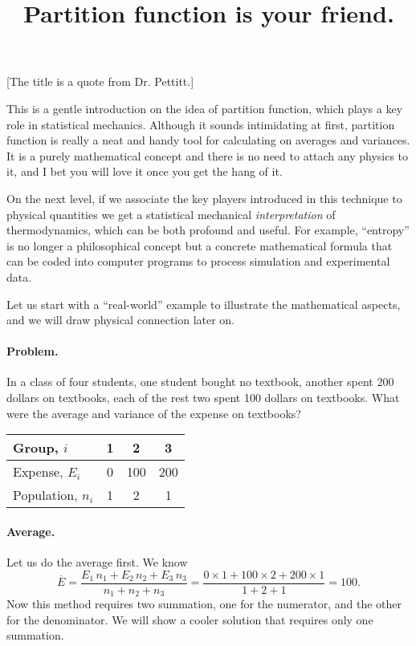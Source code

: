 \documentclass{article}
\begin{document}
\title{Partition function is your friend.}

\author{\vspace{-10ex}}
\date{\vspace{-10ex}}
\maketitle

[The title is a quote from Dr. Pettitt.]

This is a gentle introduction on the idea of partition function,
which plays a key role in statistical mechanics.
%
Although it sounds intimidating at first,
partition function is really a neat and handy tool for
calculating on averages and variances.
%
It is a purely mathematical concept and there is no need to attach
any physics to it,
and I bet you will love it once you get the hang of it.

On the next level, if we associate
the key players introduced in this technique
to physical quantities
we get a statistical mechanical \emph{interpretation}
of thermodynamics, which can be both profound and useful.
%
For example, ``entropy'' is no longer a philosophical concept
but a concrete mathematical formula that can be coded into computer programs
to process simulation and experimental data.

Let us start with a ``real-world'' example
to illustrate the mathematical aspects,
and we will draw physical connection later on.

\paragraph{Problem.}

In a class of four students,
one student bought no textbook,
another spent 200 dollars on textbooks,
each of the rest two spent 100 dollars on textbooks.
What were the average and variance of the expense on textbooks?

\begin{table}[h]
\centering
  \begin{tabular}{l | ccc}
    \hline
    Group, $i$ & 1 & 2 & 3 \\
    \hline
    Expense, $E_i$ & 0 & 100 & 200 \\
    \hline
    Population, $n_i$ & 1 & 2 & 1 \\
    \hline
  \end{tabular}
\end{table}

\paragraph{Average.}
Let us do the average first.  We know
%
\begin{equation}
  \overline E = \frac{ E_1 \,  n_1 +  E_2 \, n_2 + E_3 \, n_3 } { n_1 + n_2 + n_3 }
  = \frac{ 0 \times 1 + 100 \times 2  + 200 \times 1 } { 1 + 2 + 1 } = 100
  .
  \label{eq:Ebar_def}
\end{equation}
%
Now this method requires two summation,
one for the numerator,
and the other for the denominator.
%
We will show a cooler solution that requires only one summation.
\end{document}
